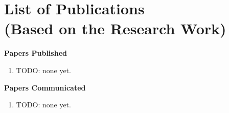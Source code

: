 \documentclass[a4paper, 12pt]{report}
\theoremstyle{definition}
\begin{document}
\chapter*{List of Publications \\ \large(Based on the Research Work)}
\textbf{\Large Papers Published}
\begin{enumerate}
	\item TODO: none yet.
\end{enumerate}\vspace{0.4cm}

\noindent \textbf{\Large Papers Communicated}
\begin{enumerate}
	\item TODO: none yet.
\end{enumerate}
\end{document}
